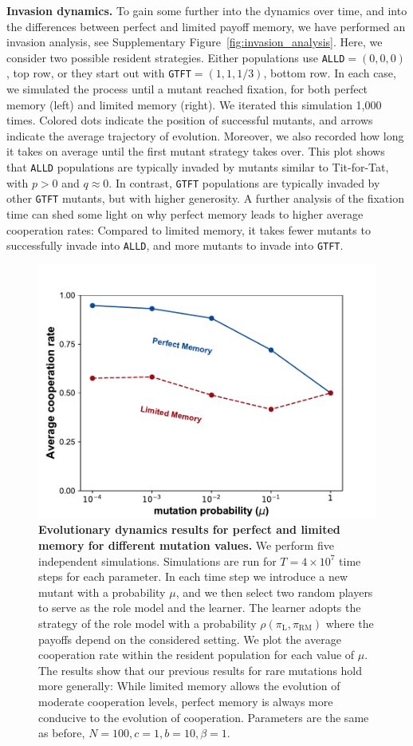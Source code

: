 \documentclass[11pt]{article}
\def\alld{\texttt{ALLD}}
\def\gtft{\texttt{GTFT}}
\def\rolemodel{\text{RM}}
\def\learner{\text{L}}
\theoremstyle{plainCl1}
\theoremstyle{plainCl2}
\begin{document}
\noindent
{\bf Invasion dynamics.} To gain some further into the dynamics over time, and into the differences between perfect and limited payoff memory, we have performed an invasion analysis, see Supplementary Figure~\ref{fig:invasion_analysis}. 
Here, we consider two possible resident strategies. 
Either populations use \alld$=(0,0,0)$, top row, or they start out with \gtft$=(1,1,1/3)$, bottom row. 
In each case, we simulated  the process until a mutant reached fixation, for both perfect memory (left) and limited memory (right). 
We iterated this simulation 1,000 times. 
Colored dots indicate the position of successful mutants, and arrows indicate the average trajectory of evolution. 
Moreover, we also recorded how long it takes on average until the first mutant strategy takes over. 
This plot shows that \alld{} populations are typically invaded by mutants similar to Tit-for-Tat, with $p\!>\!0$ and $q\!\approx\!0$. 
In contrast, \gtft{} populations are typically invaded by other \gtft{} mutants, but with higher generosity. 
A further analysis of the fixation time can shed some light on why perfect memory leads to higher average cooperation rates: 
Compared to limited memory, it takes fewer mutants to successfully invade into \alld{}, and more mutants to invade into \gtft{}.\\



\begin{figure}[!htbp]
  \centering 
  \includegraphics[width=.5\textwidth]{static/mutation_perfect_and_limited_memory_donation_game.pdf}
  \caption{\textbf{Evolutionary dynamics results for perfect and limited memory
  for different mutation values.}
  We perform five independent simulations. Simulations are run
  for $T\!=\!4\times 10^7$ time steps for each parameter. In each time step
  we introduce a new mutant with a probability \(\mu\), and we then select
  two random players to serve as the role model and the learner. The learner
  adopts the strategy of the role model with a probability \(\rho(\pi_\learner, \pi_\rolemodel)\) where the
 payoffs depend on the considered setting. We plot the average cooperation rate
  within the resident population for each value of \(\mu\). 
  The results show that our previous results for rare mutations hold more generally:
  While limited memory allows the evolution of moderate cooperation levels, perfect memory is always more conducive to the evolution of cooperation. 
   Parameters are the same as before, \(N =100, c=1, b=10, \beta=1\).}\label{fig:mutation}
\end{figure}
\end{document}
